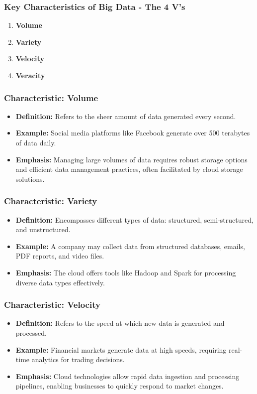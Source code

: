 \documentclass[aspectratio=169]{beamer}
\begin{document}
\begin{frame}[fragile]
    \frametitle{Key Characteristics of Big Data - The 4 V's}
    
    \begin{enumerate}
        \item \textbf{Volume}
        \item \textbf{Variety}
        \item \textbf{Velocity}
        \item \textbf{Veracity}
    \end{enumerate}
\end{frame}

\begin{frame}[fragile]
    \frametitle{Characteristic: Volume}

    \begin{itemize}
        \item \textbf{Definition:} Refers to the sheer amount of data generated every second.
        \item \textbf{Example:} Social media platforms like Facebook generate over 500 terabytes of data daily.
        \item \textbf{Emphasis:} Managing large volumes of data requires robust storage options 
        and efficient data management practices, often facilitated by cloud storage solutions.
    \end{itemize}
\end{frame}

\begin{frame}[fragile]
    \frametitle{Characteristic: Variety}

    \begin{itemize}
        \item \textbf{Definition:} Encompasses different types of data: structured, semi-structured, 
        and unstructured.
        \item \textbf{Example:} A company may collect data from structured databases, emails, 
        PDF reports, and video files.
        \item \textbf{Emphasis:} The cloud offers tools like Hadoop and Spark for processing 
        diverse data types effectively.
    \end{itemize}
\end{frame}

\begin{frame}[fragile]
    \frametitle{Characteristic: Velocity}

    \begin{itemize}
        \item \textbf{Definition:} Refers to the speed at which new data is generated and processed.
        \item \textbf{Example:} Financial markets generate data at high speeds, requiring 
        real-time analytics for trading decisions.
        \item \textbf{Emphasis:} Cloud technologies allow rapid data ingestion and processing pipelines,
        enabling businesses to quickly respond to market changes.
    \end{itemize}
\end{frame}
\end{document}
